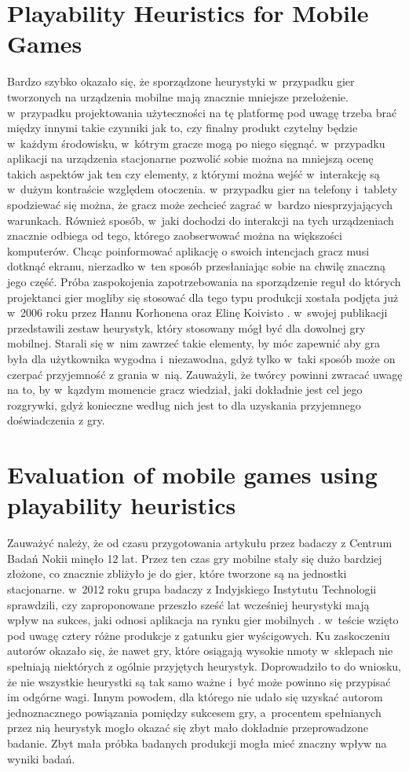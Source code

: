 \documentclass[a4paper,12pt,numbers=noenddot]{report}
\begin{document}
\section{Playability Heuristics for Mobile Games}
Bardzo szybko okazało się, że sporządzone heurystyki w~przypadku gier tworzonych na urządzenia mobilne mają znacznie mniejsze przełożenie. w~przypadku projektowania użyteczności na tę platformę pod uwagę trzeba brać między innymi takie czynniki jak to, czy finalny produkt czytelny będzie w~każdym środowisku, w~kótrym gracze mogą po niego sięgnąć. w~przypadku aplikacji na urządzenia stacjonarne pozwolić sobie można na mniejszą ocenę takich aspektów jak ten czy elementy, z którymi można wejść w~interakcję są w~dużym kontraście względem otoczenia. w~przypadku gier na telefony i~tablety spodziewać się można, że gracz może zechcieć zagrać w~bardzo niesprzyjających warunkach. Również sposób, w~jaki dochodzi do interakcji na tych urządzeniach znacznie odbiega od tego, którego zaobserwować można na większości komputerów. Chcąc poinformować aplikację o swoich intencjach gracz musi dotknąć ekranu, nierzadko w~ten sposób przesłaniając sobie na chwilę znaczną jego część. 
Próba zaspokojenia zapotrzebowania na sporządzenie reguł do których projektanci gier mogliby się stosować dla tego typu produkcji xostała podjęta już w~2006 roku przez Hannu Korhonena oraz Elinę Koivisto \cite{art_playabilityHeuristics}. w~swojej publikacji przedstawili zestaw heurystyk, który stosowany mógł być dla dowolnej gry mobilnej. Starali się w~nim zawrzeć takie elementy, by móc zapewnić aby gra była dla użytkownika wygodna i~niezawodna, gdyż tylko w~taki sposób może on czerpać przyjemność z grania w~nią. Zauważyli, że twórcy powinni zwracać uwagę na to, by w~kązdym momencie gracz wiedział, jaki dokładnie jest cel jego rozgrywki, gdyż konieczne według nich jest to dla uzyskania przyjemnego doświadczenia z gry.

\section{Evaluation of mobile games using playability heuristics}
Zauważyć należy, że od czasu przygotowania artykułu przez badaczy z Centrum Badań Nokii minęło 12 lat. Przez ten czas gry mobilne stały się dużo bardziej złożone, co znacznie zbliżyło je do gier, które tworzone są na jednostki stacjonarne. w~2012 roku grupa badaczy z Indyjskiego Instytutu Technologii sprawdzili, czy zaproponowane przeszło sześć lat wcześniej heurystyki mają wpływ na sukces, jaki odnosi aplikacja na rynku gier mobilnych  \cite{art_evaluationOfMG}. w~teście wzięto pod uwagę cztery różne produkcje z gatunku gier wyścigowych. Ku zaskoczeniu autorów okazało się, że nawet gry, które osiągają wysokie nmoty w~sklepach nie spełniają niektórych z ogólnie przyjętych heurystyk. Doprowadziło to do wniosku, że nie wszystkie heurystki są tak samo ważne i~być może powinno się przypisać im odgórne wagi. Innym powodem, dla którego nie udało się uzyskać autorom jednoznacznego powiązania pomiędzy sukcesem gry, a~procentem spełnianych przez nią heurystyk mogło okazać się zbyt mało dokładnie przeprowadzone badanie. Zbyt mała próbka badanych produkcji mogła mieć znaczny wpływ na wyniki badań.
\end{document}
